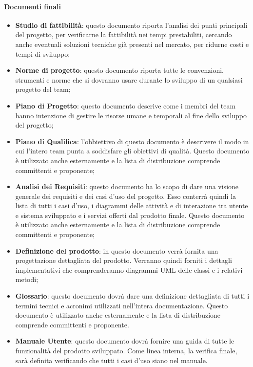 \documentclass[../NormeDiProgetto_v3.0.0.tex]{subfiles}
\begin{document}
			\paragraph{Documenti finali}
				\begin{itemize}
				\item \textbf{Studio di fattibilità}: questo documento riporta l'analisi dei punti principali del progetto, per verificarne la fattibilità nei tempi prestabiliti, cercando anche eventuali soluzioni tecniche già presenti nel mercato, per ridurne costi e tempi di sviluppo;
				\item \textbf{Norme di progetto}: questo documento riporta tutte le convenzioni, strumenti e norme che si dovranno usare durante lo sviluppo di un qualsiasi progetto del team;
				\item \textbf{Piano di Progetto}: questo documento descrive come i membri del team hanno intenzione di gestire le risorse umane e temporali al fine dello sviluppo del progetto;
				\item \textbf{Piano di Qualifica}: l'obbiettivo di questo documento è descrivere il modo in cui l'intero team punta a soddisfare gli obiettivi di qualità. Questo documento è utilizzato anche esternamente e la lista di distribuzione
				comprende committenti e proponente;
				\item \textbf{Analisi dei Requisiti}: questo documento ha lo scopo di dare una visione generale dei requisiti e dei casi d'uso del progetto.
				Esso conterrà quindi la lista di tutti i casi d'uso, i diagrammi delle attività e di interazione tra utente e sistema sviluppato e i servizi offerti dal prodotto finale. Questo documento è utilizzato anche esternamente e la lista di distribuzione comprende committenti e proponente;
				\item \textbf{Definizione del prodotto}: in questo documento verrà fornita una progettazione dettagliata del prodotto. Verranno quindi forniti i dettagli implementativi che comprenderanno diagrammi UML delle classi e i relativi metodi;
				\item \textbf{Glossario}: questo documento dovrà dare una definizione dettagliata di tutti i termini tecnici e acronimi utilizzati nell'intera documentazione. Questo documento è utilizzato anche esternamente e la lista di distribuzione comprende committenti e proponente.
				\item \textbf{Manuale Utente}: questo documento dovrà fornire una guida di tutte le funzionalità del prodotto sviluppato.
				Come linea interna, la verifica finale, sarà definita verificando che tutti i casi d'uso siano nel manuale.

\end{itemize}
\end{document}
